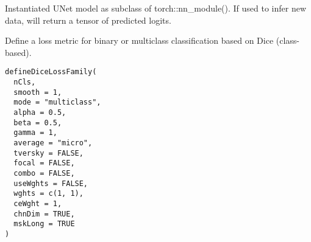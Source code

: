 \documentclass[a4paper]{book}
\begin{document}
%
\begin{Value}
Instantiated UNet model as subclass of torch::nn\_module(). If used to
infer new data, will return a tensor of predicted logits.
\end{Value}
%
\begin{Description}\relax
Define a loss metric for binary or multiclass classification based on Dice (class-based).
\end{Description}
%
\begin{Usage}
\begin{verbatim}
defineDiceLossFamily(
  nCls,
  smooth = 1,
  mode = "multiclass",
  alpha = 0.5,
  beta = 0.5,
  gamma = 1,
  average = "micro",
  tversky = FALSE,
  focal = FALSE,
  combo = FALSE,
  useWghts = FALSE,
  wghts = c(1, 1),
  ceWght = 1,
  chnDim = TRUE,
  mskLong = TRUE
)
\end{verbatim}
\end{Usage}
%
\end{document}
